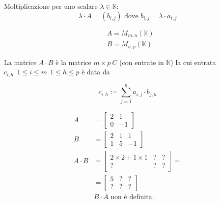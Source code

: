 Moltiplicazione per uno scalare $\lambda \in \mathbb{K}$:
\begin{equation}
  \lambda \cdot A = (b _{i,j}) \text{ dove }b _{i,j}=\lambda \cdot a _{i,j}
  \label{eq:molt_mat}
\end{equation}

\begin{definizione}
\begin{align}
  & A = M _{m,n}(\mathbb{K}) \\
  & B = M _{n,p}(\mathbb{K})
\end{align}

  La matrice $A\cdot B$ è la matrice $m\times p\ C$ (con entrate in $\mathbb{K}$) la cui entrata $c _{i,h}\ \ 1\leq i \leq m\ \ 1\leq h\leq p$ è data da

  \begin{equation}
    c _{i,h} := \sum_{j=1}^{n}a _{i,j}\cdot b _{j,h}
    \label{eq:mat_mult_entry}
  \end{equation}
\end{definizione}
\begin{esempio}
  \begin{align}
    A & = \begin{bmatrix}
      2 & 1 \\
      0 & -1
    \end{bmatrix} \\
    B & = \begin{bmatrix}
      2 & 1 & 1 \\
      1 & 5 & -1
    \end{bmatrix} \\
    A \cdot B &= \begin{bmatrix}
      2\times 2 + 1 \times 1 & ? & ? \\
      ? & ? & ?
    \end{bmatrix} = \\
    & = \begin{bmatrix}
      5 & ? & ? \\
      ? & ? & ?
    \end{bmatrix} \\
    & B \cdot A \text{ non è definita.}
  \end{align}
\end{esempio}

